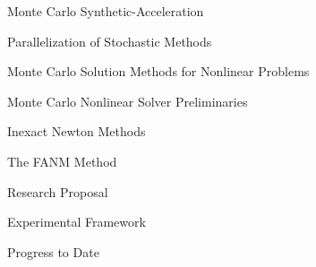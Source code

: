 \documentclass{beamer}
\begin{document}
\begin{frame}{Monte Carlo Synthetic-Acceleration}

\end{frame}

\begin{frame}{Parallelization of Stochastic Methods}

\end{frame}

\begin{frame}{Monte Carlo Solution Methods for Nonlinear Problems}

\end{frame}

\begin{frame}{Monte Carlo Nonlinear Solver Preliminaries}

\end{frame}

\begin{frame}{Inexact Newton Methods}

\end{frame}

\begin{frame}{The FANM Method}

\end{frame}

\begin{frame}{Research Proposal}

\end{frame}

\begin{frame}{Experimental Framework}

\end{frame}

\begin{frame}{Progress to Date}

\end{frame}
\end{document}

